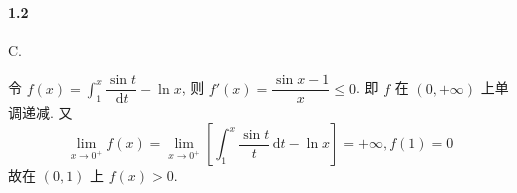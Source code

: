 \paragraph*{1.2} C.

令 $f(x)=\displaystyle\int_{1}^{x}\dfrac{\sin t}{\,\mathrm{d}t}-\ln x$, 则 $f'(x)=\dfrac{\sin x-1}{x}\leq 0$. 即 $f$ 在 $(0,+\infty)$ 上单调递减. 又
\[
	\lim_{x\to 0^{+}}f(x)=\lim_{x\to 0^{+}}\left[\int_{1}^x\dfrac{\sin t}{t}\,\mathrm{d}t-\ln x\right]=+\infty, f(1)=0
\]
故在 $(0,1)$ 上 $f(x)>0$.